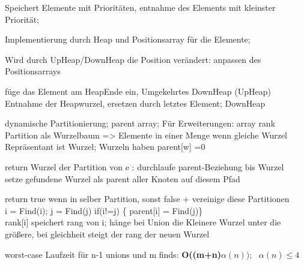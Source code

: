 Speichert Elemente mit Prioritäten, entnahme des Elements mit kleinster Priorität;
 
Implementierung durch Heap und Positionsarray für die Elemente;

Wird durch UpHeap/DownHeap die Position verändert: anpassen des Positionsarrays

 füge das Element am HeapEnde ein, Umgekehrtes DownHeap (UpHeap) \\
 Entnahme der Heapwurzel, ersetzen durch letztes Element; DownHeap

dynamische Partitionierung; parent array; Für Erweiterungen: array rank\\
Partition als Wurzelbaum => Elemente in einer Menge wenn gleiche Wurzel\\
Repräsentant ist Wurzel; Wurzeln haben parent[w] =0

return Wurzel der Partition von e : durchlaufe parent-Beziehung bis Wurzel\\
 setze gefundene Wurzel als parent aller Knoten auf diesem Pfad 

return true wenn in selber Partition, sonst false + vereinige diese Partitionen\\
i = Find(i); j = Find(j) if(i!=j) \{ parent[i] = Find(j)\}\\
 rank[i] speichert rang von i; hänge bei Union die Kleinere Wurzel unter die größere, bei gleichheit steigt der rang der neuen Wurzel

worst-case Laufzeit für n-1 unions und m finds: \textbf{O((m+n)$\alpha(n));~~~ \alpha(n) \leq 4$}

